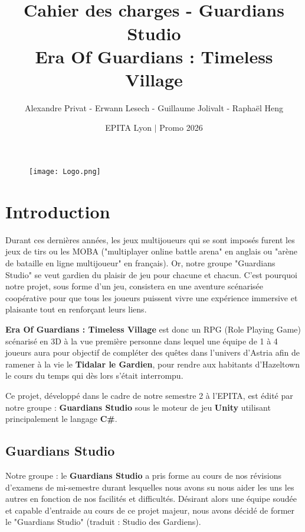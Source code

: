 \documentclass[12pt]{article}
\title {
\HRule \\[0.4cm]
    Cahier des charges - Guardians Studio
    \\
    \textbf{Era Of Guardians : Timeless Village}
\HRule \\[1cm]
}
\author {
    Alexandre Privat - Erwann Lesech - Guillaume Jolivalt - Raphaël Heng
}
\date {
    EPITA Lyon $|$ Promo 2026 
}
\begin{document}
    
    \maketitle
    \begin{figure}[h]
    \texttt{[image: Logo.png]}
    \centering
    \end{figure}
    \clearpage
    \tableofcontents
    \clearpage
    
    \section{Introduction}
        Durant ces dernières années, les jeux multijoueurs qui se sont imposés furent les jeux de tirs ou les MOBA ("multiplayer online battle arena" en anglais ou "arène de bataille en ligne multijoueur" en français). Or, notre groupe "Guardians Studio" se veut gardien du plaisir de jeu pour chacune et chacun. C'est pourquoi notre projet, sous forme d'un jeu, consistera en une aventure scénarisée coopérative pour que tous les joueurs puissent vivre une expérience immersive et plaisante tout en renforçant leurs liens.
        \\
       \par\textbf {Era Of Guardians : Timeless Village} est donc un RPG (Role Playing Game) scénarisé en 3D à la vue première personne dans lequel une équipe de 1 à 4 joueurs aura pour objectif de compléter des quêtes dans l'univers d'Astria afin de ramener à la vie le \textbf{Tidalar le Gardien}, pour rendre aux habitants d'Hazeltown le cours du temps qui dès lors s'était interrompu.
       \\
       \par Ce projet, développé dans le cadre de notre semestre 2 à l'EPITA, est édité par notre groupe : \textbf{Guardians Studio} sous le moteur de jeu \textbf{Unity} utilisant principalement le langage \textbf{C\#}.
       \\
       

        \subsection{Guardians Studio}
        Notre groupe : le \textbf{Guardians Studio} a pris forme au cours de nos révisions d'examens de mi-semestre durant lesquelles nous avons su nous aider les uns les autres en fonction de nos facilités et difficultés. Désirant alors une équipe soudée et capable d'entraide au cours de ce projet majeur, nous avons décidé de former le "Guardians Studio" (traduit : Studio des Gardiens). 
        \\
        
\end{document}
